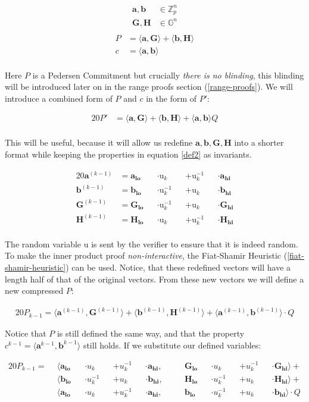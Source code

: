 \documentclass{article}
\newcommand{\eq}[1]{\begin{alignat*}{20}#1\end{alignat*}}
\newcommand{\eqn}[2]{\begin{equation}\label{#1}\begin{split}#2\end{split}\end{equation}}
\renewcommand{\vec}[1]{\boldsymbol{#1}}
\newcommand{\ran}[1]{\text{#1}}
\newcommand{\G}{\mathbb{G}}
\newcommand{\Z}{\mathbb{Z}}
\newcommand{\dotp}[2]{\langle #1, #2 \rangle}
\newcommand{\opn}[1]{\operatorname{#1}}
\newcommand{\veclo}[1]{\vec{#1_{\opn{lo}}}}
\newcommand{\vechi}[1]{\vec{#1_{\opn{hi}}}}
\begin{document}
\eqn{def1}{
	\vec{a}, \vec{b} &\in \Z^n_p \\
	\vec{G}, \vec{H} &\in \G^n \\
}
\eqn{def2}{
	P &= \dotp{\vec{a}}{\vec{G}} + \dotp{\vec{b}}{\vec{H}} \\
	c &= \dotp{\vec{a}}{\vec{b}} \\
}

Here $P$ is a Pedersen Commitment but crucially \textit{there is no
blinding}, this blinding will be introduced later on in the range proofs
section (\ref{range-proofs}). We will introduce a combined form of $P$
and $c$ in the form of $P'$:

\eq{
	P' &= \dotp{\vec{a}}{\vec{G}} +
	      \dotp{\vec{b}}{\vec{H}} +
	      \dotp{\vec{a}}{\vec{b}}Q \\
}

This will be useful, because it will allow us redefine $\vec{a},
\vec{b}, \vec{G}, \vec{H}$ into a shorter format while keeping the
properties in equation \ref{def2} as invariants.

\eq{
	\vec{a}^{(k-1)} &= \veclo{a} &&\cdot \ran{u}_k      &&+ \ran{u}^{-1}_k &&\cdot \vechi{a} \\
	\vec{b}^{(k-1)} &= \veclo{b} &&\cdot \ran{u}^{-1}_k &&+ \ran{u}_k      &&\cdot \vechi{b} \\
	\vec{G}^{(k-1)} &= \veclo{G} &&\cdot \ran{u}^{-1}_k &&+ \ran{u}_k      &&\cdot \vechi{G} \\
	\vec{H}^{(k-1)} &= \veclo{H} &&\cdot \ran{u}_k      &&+ \ran{u}^{-1}_k &&\cdot \vechi{H} \\
}

The random variable $\ran{u}$ is sent by the verifier to
ensure that it is indeed random. To make the inner product
proof \textit{non-interactive}, the Fiat-Shamir Heuristic
(\ref{fiat-shamir-heuristic}) can be used.  Notice, that these redefined
vectors will have a length half of that of the original vectors. From
these new vectors we will define a new compressed $P$:

\eq{
	P_{k-1} =
	\dotp{\vec{a}^{(k-1)}}{\vec{G}^{(k-1)}} +
	\dotp{\vec{b}^{(k-1)}}{\vec{H}^{(k-1)}} +
	\dotp{\vec{a}^{(k-1)}}{\vec{b}^{(k-1)}} \cdot Q
}

Notice that $P$ is still defined the same way, and that the property
$c^{k-1} = \dotp{\vec{a}^{k-1}}{\vec{b}^{k-1}}$ still holds. If we
substitute our defined variables:

\eq{
	P_{k-1} = \: \:
	&\dotp
		{        \veclo{a} &&\cdot u_k      &&+ u_k^{-1} &&\cdot \vechi{a}}
		{&&\quad \veclo{G} &&\cdot u_k      &&+ u_k^{-1} &&\cdot \vechi{G}}
	+ \\
	&\dotp
		{        \veclo{b} &&\cdot u_k^{-1} &&+ u_k      &&\cdot \vechi{b}}
		{&&\quad \veclo{H} &&\cdot u_k^{-1} &&+ u_k      &&\cdot \vechi{H}}
	+ \\
	&\dotp
		{        \veclo{a} &&\cdot u_k      &&+ u_k^{-1} &&\cdot \vechi{a}}
		{&&\quad \veclo{b} &&\cdot u_k^{-1} &&+ u_k      &&\cdot \vechi{b}}
	\cdot Q \\
}
\end{document}
